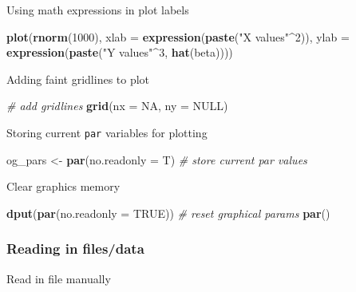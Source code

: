 \documentclass[10,portrait]{article}
\newenvironment{Shaded}{\begin{snugshade}}{\end{snugshade}}
\newcommand{\KeywordTok}[1]{\textcolor[rgb]{0.13,0.29,0.53}{\textbf{#1}}}
\newcommand{\DataTypeTok}[1]{\textcolor[rgb]{0.13,0.29,0.53}{#1}}
\newcommand{\DecValTok}[1]{\textcolor[rgb]{0.00,0.00,0.81}{#1}}
\newcommand{\StringTok}[1]{\textcolor[rgb]{0.31,0.60,0.02}{#1}}
\newcommand{\CommentTok}[1]{\textcolor[rgb]{0.56,0.35,0.01}{\textit{#1}}}
\newcommand{\OtherTok}[1]{\textcolor[rgb]{0.56,0.35,0.01}{#1}}
\newcommand{\OperatorTok}[1]{\textcolor[rgb]{0.81,0.36,0.00}{\textbf{#1}}}
\newcommand{\NormalTok}[1]{#1}
\begin{document}
Using math expressions in plot labels

\begin{Shaded}
\begin{Highlighting}[]
\KeywordTok{plot}\NormalTok{(}\KeywordTok{rnorm}\NormalTok{(}\DecValTok{1000}\NormalTok{), }\DataTypeTok{xlab =} \KeywordTok{expression}\NormalTok{(}\KeywordTok{paste}\NormalTok{(}\StringTok{"X values"}\OperatorTok{^}\DecValTok{2}\NormalTok{)), }
    \DataTypeTok{ylab =} \KeywordTok{expression}\NormalTok{(}\KeywordTok{paste}\NormalTok{(}\StringTok{"Y values"}\OperatorTok{^}\DecValTok{3}\NormalTok{, }\KeywordTok{hat}\NormalTok{(beta))))}
\end{Highlighting}
\end{Shaded}

Adding faint gridlines to plot

\begin{Shaded}
\begin{Highlighting}[]
\CommentTok{# add gridlines}
\KeywordTok{grid}\NormalTok{(}\DataTypeTok{nx =} \OtherTok{NA}\NormalTok{, }\DataTypeTok{ny =} \OtherTok{NULL}\NormalTok{)}
\end{Highlighting}
\end{Shaded}

Storing current \texttt{par} variables for plotting

\begin{Shaded}
\begin{Highlighting}[]
\NormalTok{og_pars <-}\StringTok{ }\KeywordTok{par}\NormalTok{(}\DataTypeTok{no.readonly =}\NormalTok{ T)  }\CommentTok{# store current par values}
\end{Highlighting}
\end{Shaded}

Clear graphics memory

\begin{Shaded}
\begin{Highlighting}[]
\KeywordTok{dput}\NormalTok{(}\KeywordTok{par}\NormalTok{(}\DataTypeTok{no.readonly =} \OtherTok{TRUE}\NormalTok{))  }\CommentTok{# reset graphical params }
\KeywordTok{par}\NormalTok{()}
\end{Highlighting}
\end{Shaded}

\subsubsection{Reading in files/data}\label{reading-in-filesdata}

Read in file manually
\end{document}
